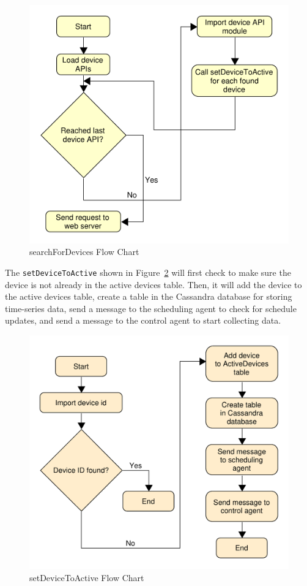 \begin{figure}[H]
    \centering
    \includegraphics[scale=0.5]{figs/searchForDevices.pdf}
    \caption{searchForDevices Flow Chart}
    \label{fig:searchForDevices}
\end{figure}
The \texttt{setDeviceToActive} shown in Figure~\ref{fig:setDeviceToActive} will first check to make sure the device is not already in the active devices table. Then, it will add the device to the active devices table, create a table in the Cassandra database for storing time-series data, send a message to the scheduling agent to check for schedule updates, and send a message to the control agent to start collecting data.
\begin{figure}[H]
    \centering
    \includegraphics[scale=0.5]{figs/setDeviceToActive.pdf}
    \caption{setDeviceToActive Flow Chart}
    \label{fig:setDeviceToActive}
\end{figure}

